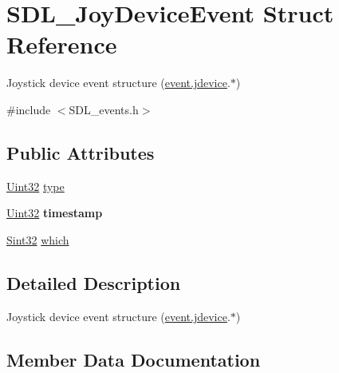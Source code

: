 \hypertarget{structSDL__JoyDeviceEvent}{}\section{S\+D\+L\+\_\+\+Joy\+Device\+Event Struct Reference}
\label{structSDL__JoyDeviceEvent}


Joystick device event structure (\hyperlink{unionSDL__Event_a17514dc19a846ea1b5fbe44123700c4c}{event.\+jdevice}.$\ast$)  




{\ttfamily \#include $<$S\+D\+L\+\_\+events.\+h$>$}

\subsection*{Public Attributes}
\begin{DoxyCompactItemize}
\item 
\hyperlink{SDL__stdinc_8h_add440eff171ea5f55cb00c4a9ab8672d}{Uint32} \hyperlink{structSDL__JoyDeviceEvent_a51f060ba1dd5669b458e9c97aece667e}{type}
\item 
\hypertarget{structSDL__JoyDeviceEvent_a5c4a9271bfff5d5c2e09a0dc732df8f3}{}\hyperlink{SDL__stdinc_8h_add440eff171ea5f55cb00c4a9ab8672d}{Uint32} {\bfseries timestamp}\label{structSDL__JoyDeviceEvent_a5c4a9271bfff5d5c2e09a0dc732df8f3}

\item 
\hyperlink{SDL__stdinc_8h_a7a90b941db9d4582e9ad7abb9940ff7e}{Sint32} \hyperlink{structSDL__JoyDeviceEvent_af9b295798f033b799ebbda7de6cb5a7e}{which}
\end{DoxyCompactItemize}


\subsection{Detailed Description}
Joystick device event structure (\hyperlink{unionSDL__Event_a17514dc19a846ea1b5fbe44123700c4c}{event.\+jdevice}.$\ast$) 

\subsection{Member Data Documentation}
\hypertarget{structSDL__JoyDeviceEvent_a51f060ba1dd5669b458e9c97aece667e}{}
